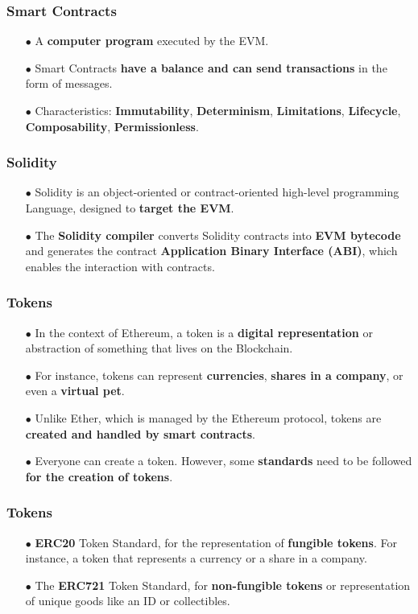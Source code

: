 \documentclass{beamer}
\begin{document}
\begin{frame}
	\frametitle{Smart Contracts}
	\begin{itemize}
		\item[$\bullet$] A \textbf{computer program} executed by the EVM.
		\item[$\bullet$] Smart Contracts \textbf{have a balance and can send transactions} in the form of messages.
		\item[$\bullet$] Characteristics: \textbf{Immutability}, \textbf{Determinism}, \textbf{Limitations}, \textbf{Lifecycle}, \textbf{Composability}, \textbf{Permissionless}.
	\end{itemize}
\end{frame}

\begin{frame}
	\frametitle{Solidity}
	\begin{itemize}
		\item[$\bullet$]  Solidity is an object-oriented or contract-oriented high-level programming Language, designed to \textbf{target the EVM}.
		\item[$\bullet$] The \textbf{Solidity compiler} converts Solidity contracts into \textbf{EVM bytecode} and generates the contract \textbf{Application Binary Interface (ABI)}, which enables the interaction with contracts.
	\end{itemize}
\end{frame}

\begin{frame}
	\frametitle{Tokens}
	\begin{itemize}
		\item[$\bullet$]  In the context of Ethereum, a token is a \textbf{digital representation} or abstraction of something that lives on the Blockchain.
		\item[$\bullet$] For instance, tokens can represent \textbf{currencies}, \textbf{shares in a company}, or even a \textbf{virtual pet}. 
		\item[$\bullet$] Unlike Ether, which is managed by the Ethereum protocol, tokens are \textbf{created and handled by smart contracts}. 
		\item[$\bullet$] Everyone can create a token. However, some \textbf{standards} need to be followed \textbf{for the creation of tokens}. 
	\end{itemize}
\end{frame}

\begin{frame}
	\frametitle{Tokens}
	\begin{itemize}
		\item[$\bullet$] \textbf{ERC20} Token Standard, for the representation of \textbf{fungible tokens}. For instance, a token that represents a currency or a share in a company. 
		\linebreak
		\linebreak
		\item[$\bullet$] The \textbf{ERC721} Token Standard, for \textbf{non-fungible tokens} or representation of unique goods like an ID or collectibles.  
	\end{itemize}
\end{frame}
\end{document}
